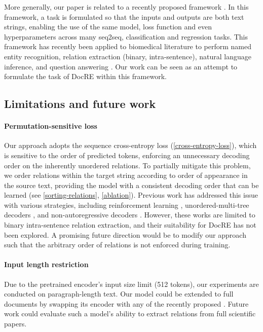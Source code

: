 \documentclass[11pt]{article}
\begin{document}
More generally, our paper is related to a recently proposed  framework \citep{raffel2020exploring}. In this framework, a task is formulated so that the inputs and outputs are both text strings, enabling the use of the same model, loss function and even hyperparameters across many seq2seq, classification and regression tasks. This framework has recently been applied to biomedical literature to perform named entity recognition, relation extraction (binary, intra-sentence), natural language inference, and question answering \citep{phan2021scifive}. Our work can be seen as an attempt to formulate the task of DocRE within this framework.

\subsection{Limitations and future work}

\paragraph{Permutation-sensitive loss} Our approach adopts the sequence cross-entropy loss (\autoref{cross-entropy-loss}), which is sensitive to the order of predicted tokens, enforcing an unnecessary decoding order on the inherently unordered relations. To partially mitigate this problem, we order relations within the target string according to order of appearance in the source text, providing the model with a consistent decoding order that can be learned (see \textsection \ref{sorting-relations}, \textsection \ref{ablation}). Previous work has addressed this issue with various strategies, including reinforcement learning \citep{zeng-etal-2019-learning}, unordered-multi-tree decoders \citep{Zhang2020MinimizeEB}, and non-autoregressive decoders \citep{sui2020joint}. However, these works are limited to binary intra-sentence relation extraction, and their suitability for DocRE has not been explored. A promising future direction would be to modify our approach such that the arbitrary order of relations is not enforced during training.

\paragraph{Input length restriction} Due to the pretrained encoder's input size limit (512 tokens), our experiments are conducted on paragraph-length text. Our model could be extended to full documents by swapping its encoder with any of the recently proposed  \citep{tay2021long}. Future work could evaluate such a model's ability to extract relations from full scientific papers.
\end{document}
